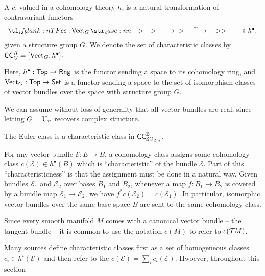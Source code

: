 \begin{definition}\label{defn:characteristic-class}
	A  $c$, valued in a cohomology theory $h$, is a natural transformation of contravariant functors
	\[
		\lkxfunc{c}{\Vect_G}{h^\bullet,}
	\]
	given a structure group $G$. We denote the set of characteristic classes by $\mathsf{CC}_G^R = [\operatorname{Vect}_G , h^\bullet]$.
\end{definition}

Here, $h^\bullet : \mathsf{Top} \to \mathsf{Rng}$ is the functor sending a space to its cohomology ring, and $\operatorname{Vect}_G : \mathsf{Top} \to \mathsf{Set}$ is a functor sending a space to the set of isomorphism classes of vector bundles over the space with structure group $G$. 

\begin{remark*}
	We can assume without loss of generality that all vector bundles are real, since letting $G=\mathrm{U}_n$ recovers complex structure. 
\end{remark*}

\begin{example}
	The Euler class is a characteristic class in $\mathsf{CC}^{\mathbb{Z}}_{\mathrm{SO}_{2m}}$.
\end{example}

For any vector bundle $\mathcal{E} : E \to B$, a cohomology class assigns some cohomology class $c(\mathcal{E})\in h^\bullet(B)$ which is ``characteristic'' of the bundle $\mathcal{E}$.
Part of this ``characteristicness'' is that the assignment must be done in a natural way. Given bundles $\mathcal{E}_1$ and $\mathcal{E}_2$ over bases $B_1$ and $B_2$, whenever a map $f : B_1 \to B_2$ is covered by a bundle map $\mathcal{E}_1 \to \mathcal{E}_2$, we have $f^* c(\mathcal{E}_2) = c(\mathcal{E}_1)$. In particular, isomorphic vector bundles over the same base space $B$ are sent to the same cohomology class. 

\begin{remark*}
	Since every smooth manifold $M$ comes with a canonical vector bundle -- the tangent bundle -- it is common to use the notation $c(M)$ to refer to $c({\mathcal{T}\hspace{-0.1em}} M)$.
\end{remark*}

\begin{remark*}
	Many sources define characteristic classes first as a set of homogeneous classes $c_i\in h^i(\mathcal{E})$ and then refer to the  $c(\mathcal{E})=\sum_i c_i(\mathcal{E})$. Hwoever, throughout this section 
\end{remark*}

